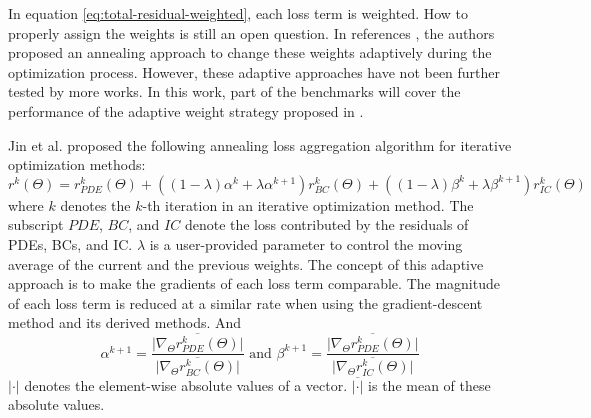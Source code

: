 In equation \eqref{eq:total-residual-weighted}, each loss term is weighted.
How to properly assign the weights is still an open question.
In references \cite{jin_nsfnets_2020,wang_understanding_2021}, the authors proposed an annealing approach to change these weights adaptively during the optimization process.
However, these adaptive approaches have not been further tested by more works.
In this work, part of the benchmarks will cover the performance of the adaptive weight strategy proposed in \cite{jin_nsfnets_2020}.

Jin et al. \cite{jin_nsfnets_2020} proposed the following annealing loss aggregation algorithm for iterative optimization methods:
\begin{equation}
    r^k(\Theta) = r_{PDE}^k(\Theta) + 
        \left(\left(1-\lambda\right)\alpha^k + \lambda\alpha^{k+1}\right)r_{BC}^k(\Theta) + 
        \left(\left(1-\lambda\right)\beta^k + \lambda\beta^{k+1}\right)r_{IC}^k(\Theta)
\end{equation}
where $k$ denotes the $k$-th iteration in an iterative optimization method.
The subscript $PDE$, $BC$, and $IC$ denote the loss contributed by the residuals of PDEs, BCs, and IC.
$\lambda$ is a user-provided parameter to control the moving average of the current and the previous weights.
The concept of this adaptive approach is to make the gradients of each loss term comparable.
The magnitude of each loss term is reduced at a similar rate when using the gradient-descent method and its derived methods.
And
\begin{equation}
    \alpha^{k+1} = \frac{\overline{\lvert\nabla_\Theta r_{PDE}^k(\Theta)\rvert}}{\overline{\lvert\nabla_\Theta r_{BC}^k(\Theta)\rvert}}
    \text{\ \ \ \ and\ \ \ \ }
    \beta^{k+1} = \frac{\overline{\lvert\nabla_\Theta r_{PDE}^k(\Theta)\rvert}}{\overline{\lvert\nabla_\Theta r_{IC}^k(\Theta)\rvert}}
\end{equation}
$\lvert\cdot\rvert$ denotes the element-wise absolute values of a vector.
$\overline{\lvert\cdot\rvert}$ is the mean of these absolute values.

